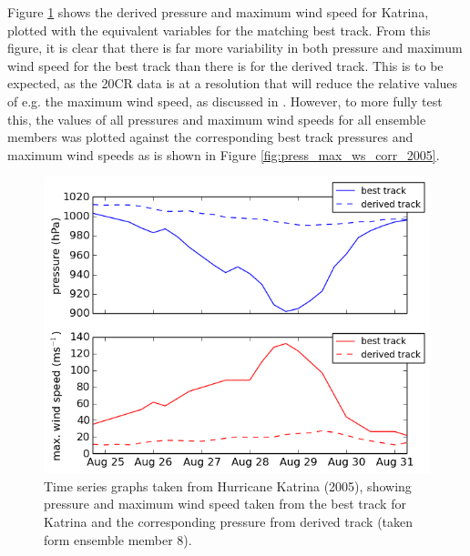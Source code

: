 \documentclass[pdftex,12pt,a4paper]{report}
\begin{document}
Figure \ref{fig:katrina_best_derived_comparison} shows the derived pressure and maximum wind speed
for Katrina, plotted with the equivalent variables for the matching best track. From this figure, it
is clear that there is far more variability in both pressure and maximum wind speed for the best
track than there is for the derived track. This is to be expected, as the 20CR data is at a
resolution that will reduce the relative values of e.g. the maximum wind speed, as discussed in
\textcite{walsh2007objectively}. However, to more fully test this, the values of all pressures and maximum wind
speeds for all ensemble members was plotted against the corresponding best track pressures and
maximum wind speeds as is shown in Figure \ref{fig:press_max_ws_corr_2005}.


\begin{figure}[hb!]
    \centering
    \includegraphics[width=\textwidth]{figures/katrina_best_derived_comparison}
    \vspace{-10pt}
    \caption{Time series graphs taken from Hurricane Katrina (2005), showing pressure and maximum
            wind speed taken from the best track for Katrina and the corresponding pressure from derived
            track (taken form ensemble member 8). }
    \label{fig:katrina_best_derived_comparison}
    \vspace{-10pt}
\end{figure}
\end{document}

